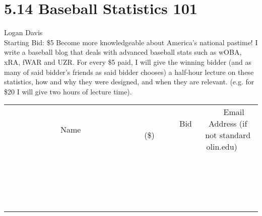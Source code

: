 \documentclass[11pt]{article}
\begin{document}
\section*{5.14 Baseball Statistics 101}
Logan Davis
\\
Starting Bid: \$5
\newline
Become more knowledgeable about America's national pastime! I write a baseball blog that deals with advanced baseball stats such as wOBA, xRA, fWAR and UZR. For every \$5 paid, I will give the winning bidder (and as many of said bidder's friends as said bidder chooses) a half-hour lecture on these statistics, how and why they were designed, and when they are relevant. (e.g. for \$20 I will give two hours of lecture time).
\\[3ex]
\begin{tabular}{c c c}
~~~~~~~~~~~~~Name~~~~~~~~~~~~~ & ~~~~~~~~~Bid (\$)~~~~~~~~~  & ~~~Email Address (if not standard olin.edu)~~~\\
 & & \\
\hline
 & & \\
\hline
 & & \\
\hline
 & & \\
\hline
 & & \\
\hline
 & & \\
\hline
 & & \\
\hline
 & & \\
\hline
 & & \\
\hline
 & & \\
\hline
 & & \\
\hline
 & & \\
\hline
 & & \\
\hline
 & & \\
\hline
 & & \\
\hline
 & & \\
\hline
 & & \\
\hline
 & & \\
\hline
 & & \\
\hline
\end{tabular}
\newpage
\end{document}
